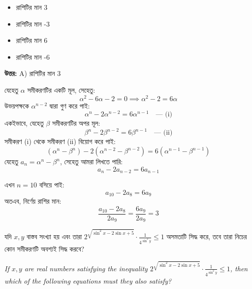 \documentclass[12pt, a4paper]{article}
\begin{document}
\begin{itemize}[label={}, leftmargin=1cm, itemsep=0.5em]
    \item[\textbf{A)}] রাশিটির মান 3
    \item[\textbf{B)}] রাশিটির মান -3
    \item[\textbf{C)}] রাশিটির মান 6
    \item[\textbf{D)}] রাশিটির মান -6
\end{itemize}

\vspace{0.5em}
\begin{tcolorbox}[answerbox]
    \textbf{\color{success} উত্তর:} A) রাশিটির মান 3
\end{tcolorbox}
\vspace{1em}

\begin{tcolorbox}[solutionbox={সমাধান (Solution)}]
    \noindent
    যেহেতু $\alpha$ সমীকরণটির একটি মূল, সেহেতু:
    \[ \alpha^2 - 6\alpha - 2 = 0 \implies \alpha^2 - 2 = 6\alpha \]
    উভয়পক্ষকে $\alpha^{n-2}$ দ্বারা গুণ করে পাই:
    \[ \alpha^n - 2\alpha^{n-2} = 6\alpha^{n-1} \quad \text{--- (i)} \]
    একইভাবে, যেহেতু $\beta$ সমীকরণটির অপর মূল:
    \[ \beta^n - 2\beta^{n-2} = 6\beta^{n-1} \quad \text{--- (ii)} \]
    সমীকরণ (i) থেকে সমীকরণ (ii) বিয়োগ করে পাই:
    \[ (\alpha^n - \beta^n) - 2(\alpha^{n-2} - \beta^{n-2}) = 6(\alpha^{n-1} - \beta^{n-1}) \]
    যেহেতু $a_n = \alpha^n - \beta^n$, সেহেতু আমরা লিখতে পারি:
    \[ a_n - 2a_{n-2} = 6a_{n-1} \]
    
    \vspace{0.5em}
    এখন $n = 10$ বসিয়ে পাই:
    \[ a_{10} - 2a_8 = 6a_9 \]
    অতএব, নির্ণেয় রাশির মান:
    \[ \frac{a_{10} - 2a_8}{2a_9} = \frac{6a_9}{2a_9} = 3 \]
\end{tcolorbox}
\vspace{1em}

\begin{tcolorbox}[questionbox={প্রশ্ন (Question) 29}]
    \noindent
    যদি $x, y$ বাস্তব সংখ্যা হয় এবং তারা $2^{\sqrt{\sin^2 x - 2\sin x + 5}} \cdot \frac{1}{4^{\sin^2 y}} \le 1$ অসমতাটি সিদ্ধ করে, তবে তারা নিচের কোন সমীকরণটি অবশ্যই সিদ্ধ করবে?
    
    \vspace{0.8em}
    \begin{english}
    \noindent\textit{\color{darkgray}
    If $x, y$ are real numbers satisfying the inequality $2^{\sqrt{\sin^2 x - 2\sin x + 5}} \cdot \frac{1}{4^{\sin^2 y}} \le 1$, then which of the following equations must they also satisfy?
    }
    \end{english}
\end{tcolorbox}
\end{document}
